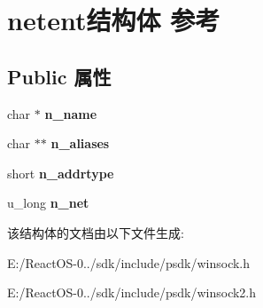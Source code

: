 \hypertarget{structnetent}{}\section{netent结构体 参考}
\label{structnetent}
\subsection*{Public 属性}
\begin{DoxyCompactItemize}
\item 
\mbox{\label{structnetent_a8fc2d35df6a86534b8721c343fc4eb8d}} 
char $\ast$ {\bfseries n\+\_\+name}
\item 
\mbox{\label{structnetent_ae5a1062c3ab04f3be8ebcea5477ee5f5}} 
char $\ast$$\ast$ {\bfseries n\+\_\+aliases}
\item 
\mbox{\label{structnetent_aaec8d5b46fb3fad14d8d5ffce6f8247d}} 
short {\bfseries n\+\_\+addrtype}
\item 
\mbox{\label{structnetent_a11dea6e411e68c34d22ea5ed4c70df62}} 
u\+\_\+long {\bfseries n\+\_\+net}
\end{DoxyCompactItemize}


该结构体的文档由以下文件生成\+:\begin{DoxyCompactItemize}
\item 
E\+:/\+React\+O\+S-\/0../sdk/include/psdk/winsock.\+h\item 
E\+:/\+React\+O\+S-\/0../sdk/include/psdk/winsock2.\+h\end{DoxyCompactItemize}
